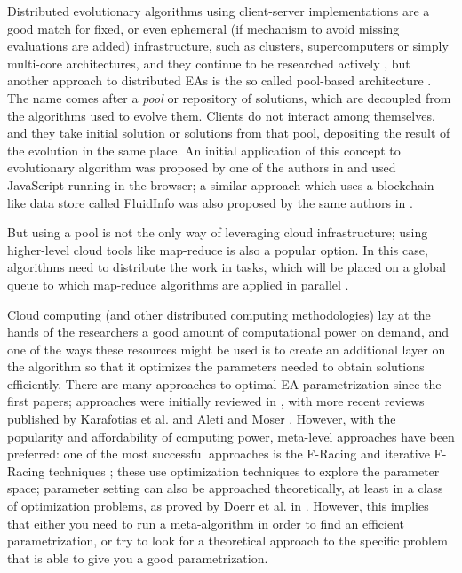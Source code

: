 \documentclass[conference]{IEEEtran}
\begin{document}
Distributed evolutionary algorithms using client-server
implementations are a good match for fixed, or even ephemeral (if
mechanism to avoid missing evaluations are added) infrastructure, such as
clusters, supercomputers or simply multi-core architectures, and they
continue to be researched actively \cite{Liu201954}, but another
approach to distributed EAs is the so called pool-based architecture
\cite{sofea:naco}. The name comes after a {\em pool} or repository of
solutions, which are decoupled from the algorithms used to evolve
them. Clients do not interact among themselves, and they take initial
solution or solutions from that pool, depositing the result of the
evolution in the same place. An initial application of this concept to
evolutionary algorithm was proposed by one of the authors in
\cite{agajaj} and used JavaScript running in the browser; a similar
approach which uses a blockchain-like data store called FluidInfo
\cite{radcliffe2012getting} was also proposed by the same authors in
\cite{DBLP:conf/cec/Merelo10}.

But using a pool is not the only way of leveraging cloud
infrastructure; using higher-level cloud tools like map-reduce is
also a popular option. In this case, algorithms need to distribute the
work in tasks, which will be placed on a global queue to which
map-reduce algorithms are applied in parallel \cite{fazenda2012,di2013towards,FlexGP}.

Cloud computing (and other distributed computing methodologies) lay at
the hands of the researchers a good amount of computational power on
demand, and one of the ways these resources might be used is to create
an additional layer on the algorithm so that it optimizes the
parameters needed to obtain solutions efficiently. There are many
approaches to optimal EA parametrization since the first papers;
approaches were initially reviewed in \cite{de2007parameter}, with more
recent reviews published by Karafotias et al. \cite{6747993} and Aleti
and Moser \cite{Aleti2016}. However, with the popularity and affordability of computing
power, meta-level approaches have been preferred: one of the most
successful approaches is the F-Racing and iterative F-Racing
techniques \cite{lopez2011irace}; these use optimization techniques to
explore the parameter space; parameter setting can also be approached
theoretically, at least in a class of optimization problems, as proved
by Doerr et al. in \cite{doerr2020theory}. However, this implies that
either you need to run a meta-algorithm in order to find an efficient
parametrization, or try to look for a theoretical approach to the
specific problem that is able to give you a good parametrization.
\end{document}
